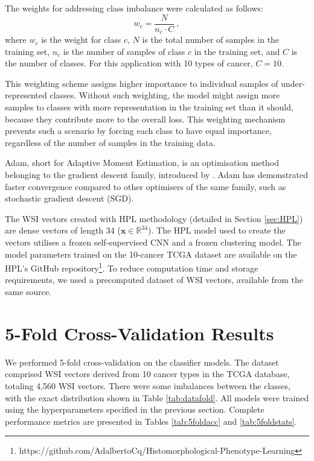 \documentclass{l4proj}
\begin{document}
The weights for addressing class imbalance were calculated as follows:
\begin{equation}
    w_c = \frac{N}{n_c \cdot C}\ ,
\end{equation}
where $w_c$ is the weight for class $c$, $N$ is the total number of samples in the training set, $n_c$ is the number of samples of class $c$ in the training set, and $C$ is the number of classes. For this application with 10 types of cancer, $C = 10$.

This weighting scheme assigns higher importance to individual samples of under-represented classes. Without such weighting, the model might assign more samples to classes with more representation in the training set than it should, because they contribute more to the overall loss. This weighting mechanism prevents such a scenario by forcing each class to have equal importance, regardless of the number of samples in the training data.

Adam, short for Adaptive Moment Estimation, is an optimisation method belonging to the gradient descent family, introduced by \cite{kingma2017}. Adam has demonstrated faster convergence compared to other optimisers of the same family, such as stochastic gradient descent (SGD).

The WSI vectors created with HPL methodology (detailed in Section \ref{sec:HPL}) are dense vectors of length 34 ($\boldsymbol{x} \in \mathbb{R}^{34}$). The HPL model used to create the vectors utilises a frozen self-supervised CNN and a frozen clustering model. The model parameters trained on the 10-cancer TCGA dataset are available on the HPL's GitHub repository\footnote{https://github.com/AdalbertoCq/Histomorphological-Phenotype-Learning}. To reduce computation time and storage requirements, we used a precomputed dataset of WSI vectors, available from the same source.

\section{5-Fold Cross-Validation Results} \label{sec:5fold}
We performed 5-fold cross-validation on the classifier models. The dataset comprised WSI vectors derived from 10 cancer types in the TCGA database, totaling 4,560 WSI vectors. There were some imbalances between the classes, with the exact distribution shown in Table \ref{tab:datafold}. All models were trained using the hyperparameters specified in the previous section. Complete performance metrics are presented in Tables \ref{tab:5foldacc} and \ref{tab:5foldstats}.
\end{document}
